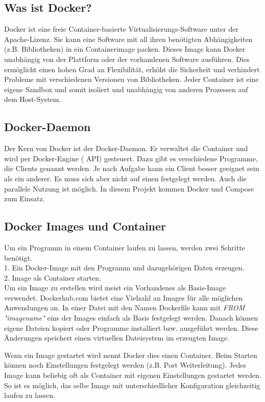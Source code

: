 \subsection{Was ist Docker? }


Docker ist eine freie Container-basierte Virtualisierungs-Software unter der Apache-Lizenz.
Sie kann eine Software mit all ihren benötigten Abhängigkeiten (z.B. Bibliotheken) in ein Containerimage packen. Dieses Image kann Docker unabhängig von der Plattform oder der vorhandenen Software ausführen. Dies ermöglicht einen hohen Grad an Flexibilität, erhöht die Sicherheit und verhindert Probleme mit verschiedenen Versionen von Bibliotheken.
Jeder Container ist eine eigene Sandbox und somit isoliert und unabhängig von anderen Prozessen auf dem Host-System.

\subsection{Docker-Daemon}
Der Kern von Docker ist der Docker-Daemon. Er verwaltet die Container und wird per Docker-Engine ( API) gesteuert. Dazu gibt es verschiedene Programme, die Clients genannt werden. Je nach Aufgabe kann ein Client besser geeignet sein als ein anderer. Es muss sich aber nicht auf einen festgelegt werden. Auch die parallele Nutzung ist möglich. In diesem Projekt kommen Docker und Compose zum Einsatz.

\subsection{Docker Images und Container}
Um ein Programm in einem  Container laufen zu lassen, werden zwei Schritte benötigt. \\
1. Ein Docker-Image mit den Programm und dazugehörigen Daten erzeugen. \\
2. Image als Container starten. \\
Um ein Image zu erstellen wird meist ein Vorhandenes als Basis-Image verwendet. Dockerhub.com bietet eine Vielzahl an Images für alle möglichen Anwendungen an.
In einer Datei mit den Namen Dockerfile kann mit \emph{FROM "imagename"} eins der Images einfach als Basis festgelegt werden. Danach können eigene Dateien kopiert oder Programme installiert bzw. ausgeführt werden. Diese Änderungen speichert einen virtuellen Dateisystem im erzeugten Image.

Wenn ein Image gestartet wird nennt Docker dies einen Container.
Beim Starten können noch Einstellungen festgelegt werden (z.B. Port Weiterleitung).
Jedes Image kann beliebig oft als Container mit eigenen Einstellungen gestartet werden. So ist es möglich, das selbe Image mit unterschiedlicher Konfiguration gleichzeitig laufen zu lassen.

